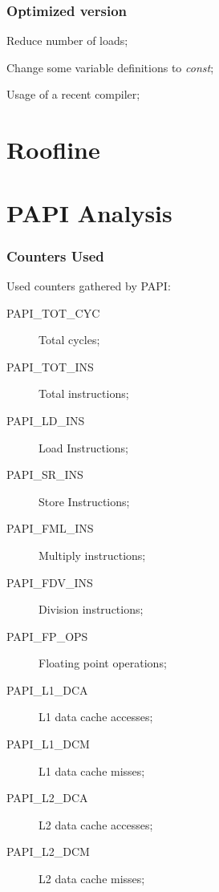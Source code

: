 \documentclass{beamer}
\begin{document}
\begin{frame}
	\frametitle{Optimized version}
	\begin{description}
		\item Reduce number of loads;
		\item Change some variable definitions to \emph{const};
		\item Usage of a recent compiler;
	\end{description} 
\end{frame}


\section{Roofline}
\begin{frame}
	\begin{figure}[!htp]
		\label{fig:roofline}
	\end{figure}
\end{frame}

\section{PAPI Analysis}
\begin{frame}
	\frametitle{Counters Used}

	Used counters gathered by PAPI:
	\begin{description}
		\item[PAPI\_TOT\_CYC] Total cycles;
		\item[PAPI\_TOT\_INS] Total instructions;
		\item[PAPI\_LD\_INS] Load Instructions;
		\item[PAPI\_SR\_INS] Store Instructions;
		\item[PAPI\_FML\_INS] Multiply instructions;
		\item[PAPI\_FDV\_INS] Division instructions;
		\item[PAPI\_FP\_OPS] Floating point operations;
		\item[PAPI\_L1\_DCA] L1 data cache accesses;
		\item[PAPI\_L1\_DCM] L1 data cache misses;
		\item[PAPI\_L2\_DCA] L2 data cache accesses;
		\item[PAPI\_L2\_DCM] L2 data cache misses;
	\end{description}
\end{frame}
\end{document}
